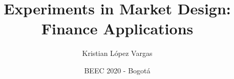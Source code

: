 \documentclass{beamer}
\title[Market Design - Experiments - Finance]{Experiments in Market Design: Finance Applications}
\author[L\'opez Vargas]{Kristian L\'opez Vargas\inst{1}}
\institute[UCSC]{\inst{1} Economics Department, University of California, Santa Cruz  }
\begin{document}
\date{BEEC 2020 - Bogotá} 

\hypertarget{start}{}



\frame{\titlepage} 




%
%
%
%
%
\end{document}
